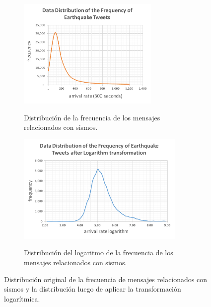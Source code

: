 \begin{figure}[ht]
\centering
	\begin{subfigure}{.5\textwidth}
		\centering
		\caption{Distribución de la frecuencia de los mensajes relacionados con sismos.} 
		\includegraphics[trim={10 12 5 60}, clip, height=150pt]{imagenes/05_Data_Distribution1.pdf}
		\label{fig:data_distribution1}
  	\end{subfigure}%
  	\begin{subfigure}{.5\textwidth}
  		\centering
  		\caption{Distribución del logaritmo de la frecuencia de los mensajes relacionados con sismos.}
  		\includegraphics[trim={10 12 5 60}, clip,  height=150pt]{imagenes/05_Data_Distribution2.pdf}
  		\label{fig:data_distribution2}
  	\end{subfigure}
  	\caption{Distribución original de la frecuencia de mensajes relacionados con sismos y la distribución luego de aplicar la transformación logarítmica.}
\end{figure}


